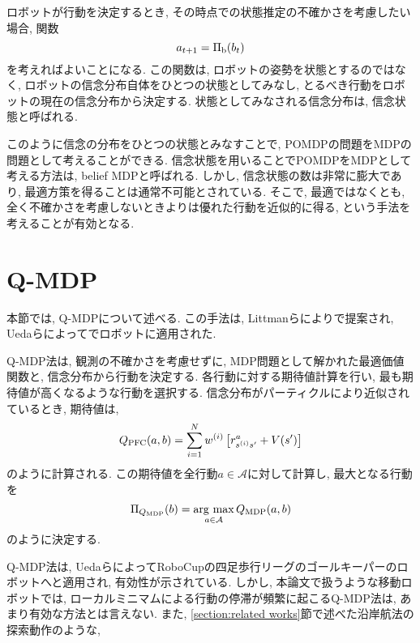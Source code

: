 ロボットが行動を決定するとき, その時点での状態推定の不確かさを考慮したい場合, 関数
\begin{equation}
\label{policy belief}
  a_{t+1} = \Pi_{\rm b} (b_{t})
\end{equation}
を考えればよいことになる. 
この関数は, ロボットの姿勢を状態とするのではなく, ロボットの信念分布自体をひとつの状態としてみなし, 
とるべき行動をロボットの現在の信念分布から決定する. 
状態としてみなされる信念分布は, 信念状態と呼ばれる. 

このように信念の分布をひとつの状態とみなすことで, POMDPの問題をMDPの問題として考えることができる. 
信念状態を用いることでPOMDPをMDPとして考える方法は, belief MDPと呼ばれる\cite{kaelbling1998}. 
しかし, 信念状態の数は非常に膨大であり, 最適方策を得ることは通常不可能とされている. 
そこで, 最適ではなくとも, 全く不確かさを考慮しないときよりは優れた行動を近似的に得る, という手法を考えることが有効となる. 


\section{Q-MDP} \label{section:q-mdp}
本節では, Q-MDPについて述べる. 
この手法は, Littmanらにより\cite{littman1995}で提案され, Uedaらによって\cite{}でロボットに適用された. 

Q-MDP法は, 観測の不確かさを考慮せずに, MDP問題として解かれた最適価値関数と, 信念分布から行動を決定する. 
各行動に対する期待値計算を行い, 最も期待値が高くなるような行動を選択する. 
信念分布がパーティクルにより近似されているとき, 期待値は, 
\begin{equation}
\label{equation:q-mdp}
  Q_{\rm PFC}(a, b) = \sum_{i=1}^{N} w^{(i)}
                      \left[r^{a}_{s^{(i)} s^{\prime}} + V(s^{\prime}) \right]
\end{equation}
のように計算される. 
この期待値を全行動$a \in \mathcal{A}$に対して計算し, 最大となる行動を
\begin{equation}
\label{equation:pi q-mdp}
  \Pi_{Q_{\rm MDP}}(b) = \mathop{\rm arg~max}\limits_{a \in \mathcal{A}} Q_{\rm MDP}(a, b)
\end{equation}
のように決定する. 

Q-MDP法は, UedaらによってRoboCupの四足歩行リーグのゴールキーパーのロボットへと適用され, 有効性が示されている\cite{ueda2003iros}. 
しかし, 本論文で扱うような移動ロボットでは, ローカルミニマムによる行動の停滞が頻繁に起こるQ-MDP法は, あまり有効な方法とは言えない. 
また, \ref{section:related works}節で述べた沿岸航法の探索動作のような, 

